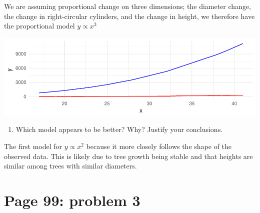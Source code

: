 \documentclass[]{article}
\newenvironment{Shaded}{\begin{snugshade}}{\end{snugshade}}
\newcommand{\KeywordTok}[1]{\textcolor[rgb]{0.13,0.29,0.53}{\textbf{{#1}}}}
\newcommand{\DataTypeTok}[1]{\textcolor[rgb]{0.13,0.29,0.53}{{#1}}}
\newcommand{\DecValTok}[1]{\textcolor[rgb]{0.00,0.00,0.81}{{#1}}}
\newcommand{\StringTok}[1]{\textcolor[rgb]{0.31,0.60,0.02}{{#1}}}
\newcommand{\NormalTok}[1]{{#1}}
\providecommand{\tightlist}{%
  \setlength{\itemsep}{0pt}\setlength{\parskip}{0pt}}
\begin{document}
We are assuming proportional change on three dimensions; the diameter
change, the change in right-circular cylinders, and the change in
height, we therefore have the proportional model \(y \propto x^3\)

\begin{Shaded}
\end{Shaded}

\includegraphics{CHunt_homework2_files/figure-latex/unnamed-chunk-4-1.pdf}

\begin{enumerate}
\def\labelenumi{\alph{enumi}.}
\setcounter{enumi}{1}
\tightlist
\item
  Which model appears to be better? Why? Justify your conclusions.
\end{enumerate}

The first model for \(y \propto x^2\) because it more closely follows
the shape of the observed data. This is likely due to tree growth being
stable and that heights are similar among trees with similar diameters.

\section{Page 99: problem 3}\label{page-99-problem-3}
\end{document}
